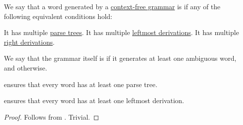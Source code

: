 \begin{definition}\label{def:grammar_ambiguity}
  We say that a word generated by a \hyperref[def:chomsky_hierarchy/context_free]{context-free grammar} is  if any of the following equivalent conditions hold:
  \begin{thmenum}
     It has multiple \hyperref[def:parse_tree]{parse trees}.
     It has multiple \hyperref[def:leftmost_derivation]{leftmost derivations}.
     It has multiple \hyperref[def:leftmost_derivation]{right derivations}.
  \end{thmenum}

  We say that the grammar itself is  if it generates at least one ambiguous word, and  otherwise.
\end{definition}
\begin{comments}
  \item {} ensures that every word has at least one parse tree.
  \item {} ensures that every word has at least one leftmost derivation.
\end{comments}
\begin{proof}
   Follows from .
   Trivial.
\end{proof}

